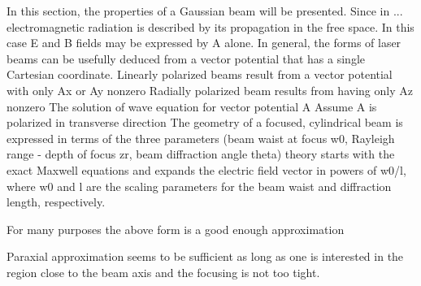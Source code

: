In this section, the properties of a Gaussian beam will be presented.
Since in ... electromagnetic radiation is described by its propagation in the free space.
In this case E and B fields may be expressed by A alone. 
In general, the forms of laser beams can be usefully deduced from a vector potential that
has a single Cartesian coordinate.
Linearly polarized beams result from a vector potential with only Ax or Ay nonzero
Radially polarized beam results from having only Az nonzero
The solution of wave equation for vector potential A
Assume A is polarized in transverse direction 
The geometry of a focused, cylindrical beam is expressed in terms
of the three parameters (beam waist at focus w0, Rayleigh range - depth of focus zr, beam diffraction angle theta)
theory starts with the exact Maxwell equations and expands the electric field vector in powers of w0/l, where w0 and l are the scaling parameters for the beam waist and diffraction length, respectively.

For many purposes the above form is a good enough approximation

Paraxial approximation seems to be sufficient as long as one is interested in the region close to the beam axis and the focusing is not too tight.